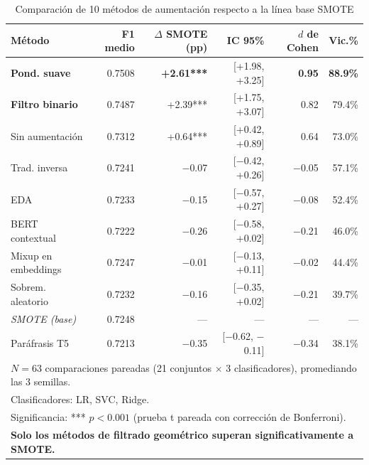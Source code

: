 \begin{table}[htbp]
\centering
\caption{Comparación de 10 métodos de aumentación respecto a la línea base SMOTE}
\label{tab:modern_method_comparison}
\small
\begin{tabular}{lrrrrr}
\toprule
\textbf{Método} & \textbf{F1 medio} & \textbf{$\Delta$ SMOTE (pp)} & \textbf{IC 95\%} & \textbf{$d$ de Cohen} & \textbf{Vic.\%} \\
\midrule
\rowcolor{green!20}
\textbf{Pond. suave}      & 0.7508 & \textbf{+2.61***} & [+1.98, +3.25] & \textbf{0.95} & \textbf{88.9\%} \\
\rowcolor{green!10}
\textbf{Filtro binario}   & 0.7487 & +2.39***           & [+1.75, +3.07] & 0.82          & 79.4\%          \\
Sin aumentación            & 0.7312 & +0.64***           & [+0.42, +0.89] & 0.64          & 73.0\%          \\
Trad. inversa              & 0.7241 & $-$0.07            & [$-$0.42, +0.26] & $-$0.05     & 57.1\%          \\
EDA                        & 0.7233 & $-$0.15            & [$-$0.57, +0.27] & $-$0.08     & 52.4\%          \\
BERT contextual            & 0.7222 & $-$0.26            & [$-$0.58, +0.02] & $-$0.21     & 46.0\%          \\
Mixup en embeddings           & 0.7247 & $-$0.01            & [$-$0.13, +0.11] & $-$0.02     & 44.4\%          \\
Sobrem. aleatorio          & 0.7232 & $-$0.16            & [$-$0.35, +0.02] & $-$0.21     & 39.7\%          \\
\textit{SMOTE (base)}      & 0.7248 & ---                & ---              & ---           & ---             \\
Paráfrasis T5              & 0.7213 & $-$0.35            & [$-$0.62, $-$0.11] & $-$0.34   & 38.1\%          \\
\midrule
\multicolumn{6}{l}{\small $N=63$ comparaciones pareadas (21 conjuntos $\times$ 3 clasificadores), promediando las 3 semillas.} \\
\multicolumn{6}{l}{\small Clasificadores: LR, SVC, Ridge.} \\
\multicolumn{6}{l}{\small Significancia: *** $p<0.001$ (prueba t pareada con corrección de Bonferroni).} \\
\multicolumn{6}{l}{\small \textbf{Solo los métodos de filtrado geométrico superan significativamente a SMOTE.}} \\
\bottomrule
\end{tabular}
\end{table}
